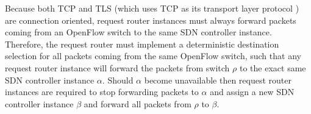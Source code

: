 Because both \gls{TCP} and \gls{TLS} (which uses \gls{TCP} as its transport layer protocol \cite{rfc5246}) are connection oriented, request router instances must always forward packets coming from an OpenFlow switch to the same \gls{SDN} controller instance.
Therefore, the request router must implement a deterministic destination selection for all packets coming from the same OpenFlow switch, such that any request router instance will forward the packets from switch $\rho$ to the exact same \gls{SDN} controller instance $\alpha$.
Should $\alpha$ become unavailable then request router instances are required to stop forwarding packets to $\alpha$ and assign a new \gls{SDN} controller instance $\beta$ and forward all packets from $\rho$ to $\beta$.
